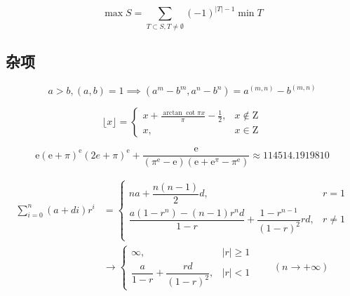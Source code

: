 \begin{equation}
    \max S=\sum_{T\subset S, T\neq \emptyset}(-1)^{|T|-1}\min T
\end{equation}

\subsection{杂项}

\begin{equation}
    a>b,(a,b)=1 \implies (a^m-b^m,a^n-b^n)=a^{(m,n)}-b^{(m,n)}
\end{equation}

\begin{equation}
    \lfloor x\rfloor=\begin{cases}
        \displaystyle x+\frac{\arctan\cot\pi x}{\pi}-\frac{1}{2}, & x\notin\mathrm{Z} \\
        x,                                                        & x\in\mathrm{Z}
    \end{cases}
\end{equation}

\begin{equation}
    \mathrm{e}(\mathrm{e}+\pi)^\mathrm{e}(2e + \pi)^\mathrm{e}+\frac{\mathrm{e}}{(\pi^\mathrm{e}-\mathrm{e})(\mathrm{e}+\mathrm{e}^\pi-\pi^\mathrm{e})}\approx 114514.1919810
\end{equation}

\begin{equation}
    \begin{aligned}
        \sum_{i=0}^n(a+di)r^i & =\begin{cases}
                                     na+\dfrac{n(n-1)}{2}d,                                        & r=1    \\
                                     \dfrac{a(1-r^n)-(n-1)r^nd}{1-r}+\dfrac{1-r^{n-1}}{(1-r)^2}rd, & r\ne 1 \\
                                 \end{cases} \\
                              & \to\begin{cases}
                                       \infty,                             & |r|\geq 1 \\
                                       \dfrac{a}{1-r}+\dfrac{rd}{(1-r)^2}, & |r|<1
                                   \end{cases}\qquad(n\to+\infty)
    \end{aligned}
\end{equation}

